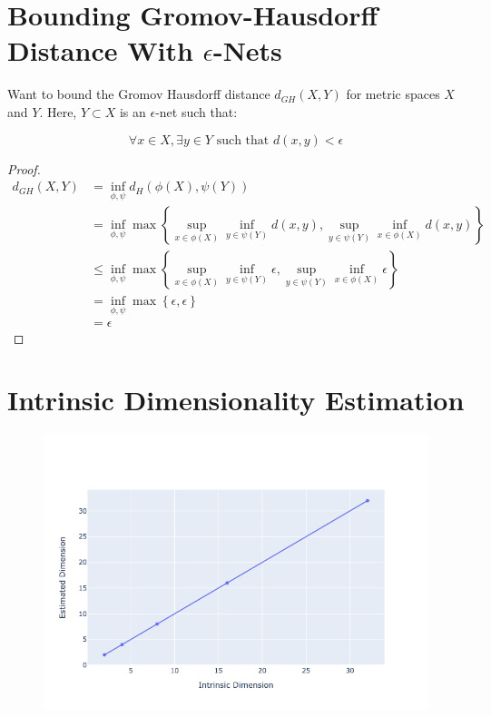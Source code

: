 \documentclass{article}
\begin{document}
\section{Bounding Gromov-Hausdorff Distance With $\epsilon$-Nets}

    Want to bound the Gromov Hausdorff distance $d_{GH}(X,Y)$ for metric spaces $X$ and $Y$. Here, $Y \subset X$ is an $\epsilon$-net such that:

    \begin{equation*}
        \forall x \in X, \exists y \in Y \text{ such that } d(x,y) < \epsilon
    \end{equation*}

    \begin{proof}
        \begin{align*}
            d_{GH}(X,Y) &= \inf_{\phi, \psi} d_H(\phi(X), \psi(Y)) \\
            &= \inf_{\phi, \psi} \max \left\{ \sup_{x \in \phi(X)} \inf_{y \in \psi(Y)} d(x,y), \sup_{y \in \psi(Y)} \inf_{x \in \phi(X)} d(x,y) \right\} \\
            & \leq \inf_{\phi, \psi} \max \left\{ \sup_{x \in \phi(X)} \inf_{y \in \psi(Y)} \epsilon, \sup_{y \in \psi(Y)} \inf_{x \in \phi(X)} \epsilon \right\} \\
            &= \inf_{\phi, \psi} \max \left\{ \epsilon, \epsilon \right\} \\
            &= \epsilon
        \end{align*}
    \end{proof}

\section{Intrinsic Dimensionality Estimation}

    \begin{figure}[h]
        \label{fig:ps1_clustering_original} 
        \includegraphics[width=\linewidth]{images/q6/gaussian.png}
    \end{figure}
\end{document}
